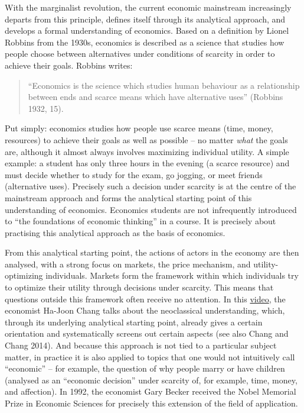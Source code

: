 \documentclass[
  british,
  a4paper,
  DIV=11,
  numbers=noendperiod,
  oneside,
  openany]{scrreprt}
\begin{document}
With the marginalist revolution, the current economic mainstream
increasingly departs from this principle, defines itself through its
analytical approach, and develops a formal understanding of economics.
Based on a definition by Lionel Robbins from the 1930s, economics is
described as a science that studies how people choose between
alternatives under conditions of scarcity in order to achieve their
goals. Robbins writes:

\begin{quote}
``Economics is the science which studies human behaviour as a
relationship between ends and scarce means which have alternative uses''
(Robbins 1932, 15).
\end{quote}

Put simply: economics studies how people use scarce means (time, money,
resources) to achieve their goals as well as possible -- no matter
\emph{what} the goals are, although it almost always involves maximizing
individual utility. A simple example: a student has only three hours in
the evening (a scarce resource) and must decide whether to study for the
exam, go jogging, or meet friends (alternative uses). Precisely such a
decision under scarcity is at the centre of the mainstream approach and
forms the analytical starting point of this understanding of economics.
Economics students are not infrequently introduced to ``the foundations
of economic thinking'' in a course. It is precisely about practising
this analytical approach as the basis of economics.

From this analytical starting point, the actions of actors in the
economy are then analysed, with a strong focus on markets, the price
mechanism, and utility-optimizing individuals. Markets form the
framework within which individuals try to optimize their utility through
decisions under scarcity. This means that questions outside this
framework often receive no attention. In this
\href{https://www.youtube.com/watch?v=D-6rQmHpGfE}{video}, the economist
Ha-Joon Chang talks about the neoclassical understanding, which, through
its underlying analytical starting point, already gives a certain
orientation and systematically screens out certain aspects (see also
Chang and Chang 2014). And because this approach is not tied to a
particular subject matter, in practice it is also applied to topics that
one would not intuitively call ``economic'' -- for example, the question
of why people marry or have children (analysed as an ``economic
decision'' under scarcity of, for example, time, money, and affection).
In 1992, the economist Gary Becker received the Nobel Memorial Prize in
Economic Sciences for precisely this extension of the field of
application.
\end{document}
